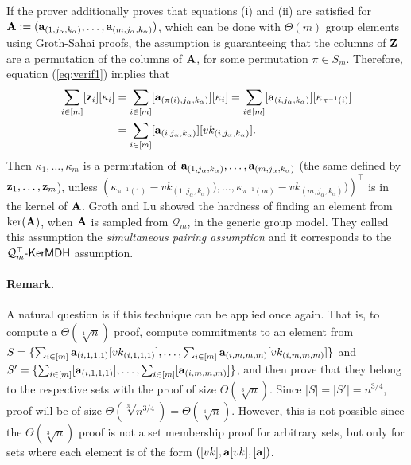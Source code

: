 If the prover additionally proves that equations (i) and (ii) are satisfied for $\mathbf{{A}}:=(\mathbf{a}_{(1,j_\alpha,k_\alpha)},\ldots,\mathbf{a}_{(m,j_\alpha,k_\alpha)})$, which can be done with $\Theta(m)$ group elements using Groth-Sahai proofs, the assumption is guaranteeing that the columns of $\mathbf{{Z}}$ are a permutation of the columns of $\mathbf{{A}}$, for some permutation $\pi\in S_m$. Therefore, equation (\ref{eq:verif1}) implies that
\begin{align*}
\sum_{i\in[m]}[\mathbf{z}_i][\kappa_i]&=\sum_{i\in[m]}[\mathbf{a}_{(\pi(i),j_\alpha,k_\alpha)}][\kappa_i]=\sum_{i\in[m]}[\mathbf{a}_{(i,j_\alpha,k_\alpha)}][\kappa_{\pi^{-1}(i)}]\\
&=\sum_{i\in[m]}[\mathbf{a}_{(i,j_\alpha,k_\alpha)}][vk_{(i,j_\alpha,k_\alpha)}].
\end{align*}
Then $\kappa_1,\ldots,\kappa_m$ is a permutation of $\mathbf{a}_{(1,j_\alpha,k_\alpha)},\ldots,\mathbf{a}_{(m,j_\alpha,k_\alpha)}$ (the same defined by $\mathbf{z}_1,\ldots,\mathbf{z}_m$), unless $(\kappa_{\pi^{-1}(1)}-{vk_{(1,j_\alpha,k_\alpha)}),\ldots,\kappa_{\pi^{-1}(m)}-vk_{(m,j_\alpha,k_\alpha)})})^\top$ is in the kernel of $\mathbf{{A}}$. Groth and Lu showed the hardness of finding an element from $\ker(\mathbf{{A}})$, when $\mathbf{{A}}$ is sampled from $\mathcal{Q}_m$, in the generic group model. They called this assumption the \emph{simultaneous pairing assumption} and it corresponds to the $\mathcal{Q}_m^\top\mbox{-}\mathsf{KerMDH}$ assumption.


\paragraph{Remark.}
A natural question is if this technique can be applied once again. That is, to compute a $\Theta(\sqrt[4]{n})$  proof, compute commitments to an element from $S=\{\sum_{i\in[m]}\mathbf{a}_{(i,1,1,1)}[vk_{(i,1,1,1)}],\ldots,\sum_{i\in[m]}\mathbf{a}_{(i,m,m,m)}[vk_{(i,m,m,m)}]\}$ and $S'=\allowbreak\{\sum_{i\in[m]}[\mathbf{a}_{(i,1,1,1)}],\ldots,\sum_{i\in[m]}[\mathbf{a}_{(i,m,m,m)}]\}$, and then prove that they belong to the respective sets with the proof of size $\Theta(\sqrt[3]{n})$. Since $|S|=|S'|=n^{3/4}$, proof will be of size $\Theta(\sqrt[3]{n^{3/4}})=\Theta(\sqrt[4]{n})$. However, this is not possible since the $\Theta(\sqrt[3]{n})$ proof is not a set membership proof for arbitrary sets, but only for sets where each element is of the form $([vk],\mathbf{a}[vk],[\mathbf{a}])$.

